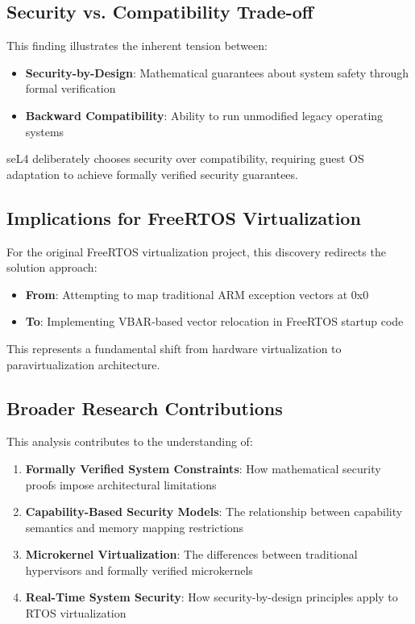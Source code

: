 \documentclass[11pt,a4paper]{article}
\begin{document}
\subsection{Security vs. Compatibility Trade-off}

This finding illustrates the inherent tension between:
\begin{itemize}
    \item \textbf{Security-by-Design}: Mathematical guarantees about system safety through formal verification
    \item \textbf{Backward Compatibility}: Ability to run unmodified legacy operating systems
\end{itemize}

seL4 deliberately chooses security over compatibility, requiring guest OS adaptation to achieve formally verified security guarantees.

\subsection{Implications for FreeRTOS Virtualization}

For the original FreeRTOS virtualization project, this discovery redirects the solution approach:
\begin{itemize}
    \item \textbf{From}: Attempting to map traditional ARM exception vectors at 0x0
    \item \textbf{To}: Implementing VBAR-based vector relocation in FreeRTOS startup code
\end{itemize}

This represents a fundamental shift from hardware virtualization to paravirtualization architecture.

\subsection{Broader Research Contributions}

This analysis contributes to the understanding of:
\begin{enumerate}
    \item \textbf{Formally Verified System Constraints}: How mathematical security proofs impose architectural limitations
    \item \textbf{Capability-Based Security Models}: The relationship between capability semantics and memory mapping restrictions
    \item \textbf{Microkernel Virtualization}: The differences between traditional hypervisors and formally verified microkernels
    \item \textbf{Real-Time System Security}: How security-by-design principles apply to RTOS virtualization
\end{enumerate}
\end{document}
